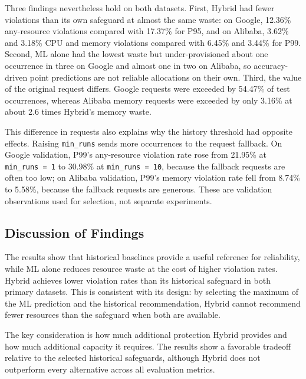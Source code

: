 \documentclass{IEEEtran}
\begin{document}
Three findings nevertheless hold on both datasets. First, Hybrid had fewer violations than its own safeguard at almost the same waste: on Google, 12.36\% any-resource violations compared with 17.37\% for P95, and on Alibaba, 3.62\% and 3.18\% CPU and memory violations compared with 6.45\% and 3.44\% for P99. Second, ML alone had the lowest waste but under-provisioned about one occurrence in three on Google and almost one in two on Alibaba, so accuracy-driven point predictions are not reliable allocations on their own. Third, the value of the original request differs. Google requests were exceeded by 54.47\% of test occurrences, whereas Alibaba memory requests were exceeded by only 3.16\% at about 2.6 times Hybrid's memory waste.

This difference in requests also explains why the history threshold had opposite effects. Raising \texttt{min\_runs} sends more occurrences to the request fallback. On Google validation, P99's any-resource violation rate rose from 21.95\% at \texttt{min\_runs\ =\ 1} to 30.98\% at \texttt{min\_runs\ =\ 10}, because the fallback requests are often too low; on Alibaba validation, P99's memory violation rate fell from 8.74\% to 5.58\%, because the fallback requests are generous. These are validation observations used for selection, not separate experiments.

\subsection{Discussion of Findings}\label{sec:7.5}

The results show that historical baselines provide a useful reference for reliability, while ML alone reduces resource waste at the cost of higher violation rates. Hybrid achieves lower violation rates than its historical safeguard in both primary datasets. This is consistent with its design: by selecting the maximum of the ML prediction and the historical recommendation, Hybrid cannot recommend fewer resources than the safeguard when both are available.

The key consideration is how much additional protection Hybrid provides and how much additional capacity it requires. The results show a favorable tradeoff relative to the selected historical safeguards, although Hybrid does not outperform every alternative across all evaluation metrics.
\end{document}

